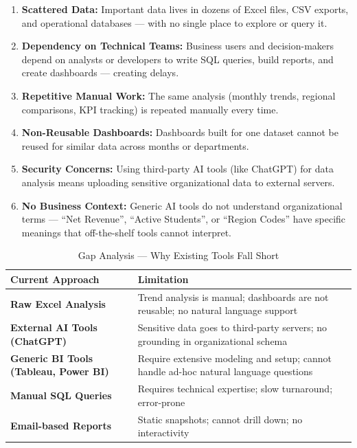 \documentclass[12pt,a4paper]{report}
\begin{document}
\begin{enumerate}[leftmargin=1.5cm]
    \item \textbf{Scattered Data:} Important data lives in dozens of Excel files, CSV exports, and operational databases --- with no single place to explore or query it.
    \item \textbf{Dependency on Technical Teams:} Business users and decision-makers depend on analysts or developers to write SQL queries, build reports, and create dashboards --- creating delays.
    \item \textbf{Repetitive Manual Work:} The same analysis (monthly trends, regional comparisons, KPI tracking) is repeated manually every time.
    \item \textbf{Non-Reusable Dashboards:} Dashboards built for one dataset cannot be reused for similar data across months or departments.
    \item \textbf{Security Concerns:} Using third-party AI tools (like ChatGPT) for data analysis means uploading sensitive organizational data to external servers.
    \item \textbf{No Business Context:} Generic AI tools do not understand organizational terms --- ``Net Revenue'', ``Active Students'', or ``Region Codes'' have specific meanings that off-the-shelf tools cannot interpret.
\end{enumerate}

\begin{table}[H]
\centering
\caption{Gap Analysis --- Why Existing Tools Fall Short}
\begin{tabular}{>{\bfseries}p{4cm} p{8.5cm}}
\toprule
\textbf{Current Approach} & \textbf{Limitation} \\
\midrule
Raw Excel Analysis & Trend analysis is manual; dashboards are not reusable; no natural language support \\
External AI Tools (ChatGPT) & Sensitive data goes to third-party servers; no grounding in organizational schema \\
Generic BI Tools (Tableau, Power BI) & Require extensive modeling and setup; cannot handle ad-hoc natural language questions \\
Manual SQL Queries & Requires technical expertise; slow turnaround; error-prone \\
Email-based Reports & Static snapshots; cannot drill down; no interactivity \\
\bottomrule
\end{tabular}
\label{tab:gap_analysis}
\end{table}
\end{document}
